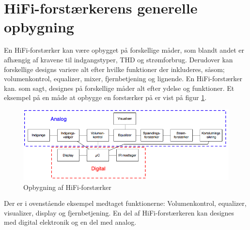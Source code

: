 \section{HiFi-forstærkerens generelle opbygning}

En HiFi-forstærker kan være opbygget på forskellige måder, som blandt andet er afhængig af kravene til indgangstyper, THD og strømforbrug. Derudover kan forskellige designs variere alt efter hvilke funktioner der inkluderes, såsom; volumenkontrol, equalizer, mixer, fjernbetjening og lignende. 
En HiFi-forstærker kan. som sagt, designes på forskellige måder alt efter ydelse og funktioner. Et eksempel på en måde at opbygge en forstærker på er vist på figur \ref{fig:forstaerker_opbygning}.

\begin{figure}[h]
\centering
\includegraphics[scale=.6]{indledende_analyse/generel_effektforstaerker/forstaerker_opbygning.png}
\caption{Opbygning af HiFi-forstærker}
\label{fig:forstaerker_opbygning}
\end{figure}

Der er i ovenstående eksempel medtaget funktionerne: Volumenkontrol, equalizer, visualizer, display og fjernbetjening. En del af HiFi-forstærkeren kan designes med digital elektronik og en del med analog. 